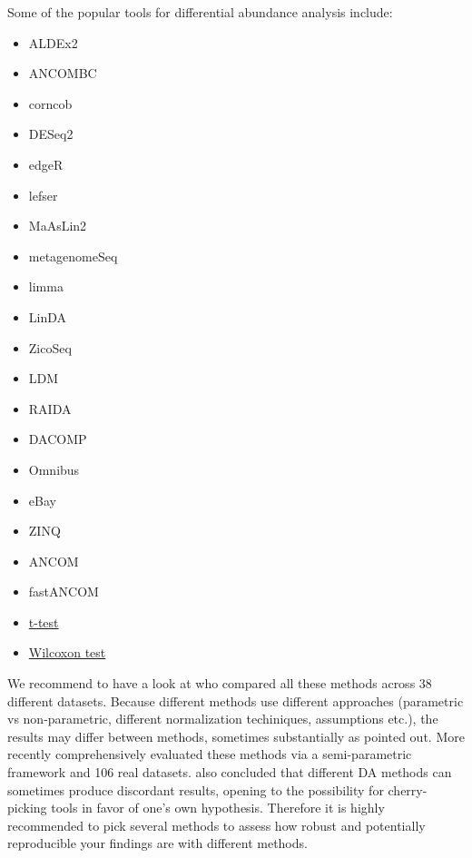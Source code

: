 \documentclass[
]{book}
\providecommand{\tightlist}{%
  \setlength{\itemsep}{0pt}\setlength{\parskip}{0pt}}
\begin{document}
Some of the popular tools for differential abundance analysis include:

\begin{itemize}
\tightlist
\item
  ALDEx2 \citep{Gloor2016}
\item
  ANCOMBC \citep{ancombc2020}
\item
  corncob \citep{Martin2021}
\item
  DESeq2 \citep{Love2014}
\item
  edgeR \citep{Chen2016}
\item
  lefser \citep{Khlebrodova2021}
\item
  MaAsLin2 \citep{Mallick2020}
\item
  metagenomeSeq \citep{Paulson2017}
\item
  limma \citep{Ritchie2015}
\item
  LinDA \citep{Zhou2022}
\item
  ZicoSeq \citep{Yang2022}
\item
  LDM \citep{Hu2020}
\item
  RAIDA \citep{Sohn2015}
\item
  DACOMP \citep{Brill2019}
\item
  Omnibus \citep{Omnibus2018}
\item
  eBay \citep{Liu2020}
\item
  ZINQ \citep{Ling2021}
\item
  ANCOM \citep{Mandal2015}
\item
  fastANCOM \citep{fastANCOM2022}
\item
  \href{https://www.rdocumentation.org/packages/stats/versions/3.6.2/topics/t.test}{t-test}\\
\item
  \href{https://www.rdocumentation.org/packages/stats/versions/3.6.2/topics/wilcox.test}{Wilcoxon test}
\end{itemize}

We recommend to have a look at \citet{Nearing2022} who compared all these
methods across 38 different datasets. Because different methods use
different approaches (parametric vs non-parametric, different
normalization techiniques, assumptions etc.), the results may differ
between methods, sometimes substantially as \citet{Nearing2022} pointed
out. More recently \citet{Yang2022} comprehensively evaluated these methods
via a semi-parametric framework and 106 real datasets. \citet{Yang2022} also
concluded that different DA methods can sometimes produce discordant
results, opening to the possibility for cherry-picking tools in favor
of one's own hypothesis. Therefore it is highly recommended to pick
several methods to assess how robust and potentially reproducible your
findings are with different methods.
\end{document}
